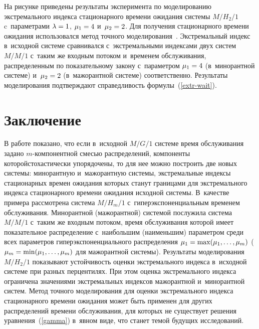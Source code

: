 \begin{multicols}{2}
\begin{equation*}
\end{equation*}
На рисунке приведены результаты эксперимента  по  моделированию экстремального 
индекса стационарного времени ожидания системы $M/H_2/1$ c~параметрами 
$\lambda\hm=1$, $\mu_1\hm=4$ и~$\mu_2\hm=2$. Для получения стационарного времени ожидания 
использовался метод точного моделирования~\cite{sigman}. Экстремальный индекс 
в~исходной системе сравнивался с~экстремальными индексами двух систем $M/M/1$ 
с~таким же входным потоком и~временем обслуживания, распределенным по 
показательному закону  с~па\-ра\-мет\-ром $\mu_1\hm=4$ (в~минорантной сис\-те\-ме) 
и~$\mu_2\hm=2$ (в~мажорантной сис\-те\-ме) соответственно. Результаты моделирования 
подтверждают спра\-вед\-ли\-вость формулы~(\ref{extr-wait}).

\vspace*{-9pt}


\section{Заключение}

\vspace*{-4pt}

В работе показано, что если в~исходной  $M/G/1$  системе
время обслуживания задано \mbox{$m$-ком}\-по\-нент\-ной смесью распределений, компоненты 
которой\linebreak стохастически упорядочены, то для нее можно построить две новых сис\-те\-мы: 
минорантную и~мажорантную сис\-те\-мы, экстремальные индексы стационарных времен 
ожидания  которых станут \mbox{границами} для экстремального индекса стационарного 
времени ожидания исходной сис\-те\-мы.
 В~качестве примера рассмотрена сис\-те\-ма $M/H_m/1$ с~гиперэкспоненциальным 
временем обслуживания. Минорантной (мажорантной) сис\-те\-мой послужила сис\-те\-ма 
$M/M/1$ с~таким же входным потоком, время обслуживания которой имеет 
показательное распределение с~наибольшим (наименьшим) па\-ра\-мет\-ром среди всех 
параметров гиперэкспоненциального распределения $\mu_1\hm=\max(\mu_1,\dots ,\mu_m)$ 
($\mu_m\hm=\min(\mu_1,\dots ,\mu_m)$ для мажорантной сис\-те\-мы).  Результаты 
моделирования $M/H_2/1$ показывают устойчивость оценки экстремального индекса 
в~исходной сис\-те\-ме  при разных перцентилях. При этом оценка экстремального индекса 
ограничена значениями экстремальных индексов мажорантной и~минорантной сис\-тем.
 Метод точного моделирования  для оценки экстремального индекса стационарного 
времени ожидания может быть применен  для других распределений времени 
обслуживания, для которых не существует решения уравнения~(\ref{gamma}) в~явном 
виде,  что станет темой будущих исследований.


\end{multicols}
